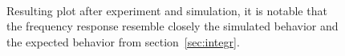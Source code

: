 \documentclass[a4paper, twocolumn]{article}
\begin{document}
\begin{figure}[!ht]
    \centering
     \\
    \caption{Resulting plot after experiment and simulation, it is notable that the frequency response resemble closely the simulated behavior and the expected behavior from section~\ref{sec:integr}.}
    \label{fig:expIntegr}
\end{figure}
\end{document}
